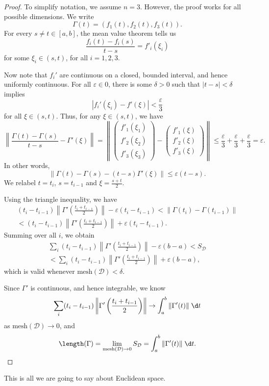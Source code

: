 \documentclass[a4paper]{article}
\begin{document}
\begin{proof}
  To simplify notation, we assume $n = 3$. However, the proof works for all possible dimensions. We write
  \[
    \Gamma(t) = (f_1(t), f_2(t), f_3(t)).
  \]
  For every $s \not= t \in [a, b]$, the mean value theorem tells us
  \[
    \frac{f_i(t) - f_i(s)}{t - s} = f'_i (\xi_i)
  \]
  for some $\xi_i \in (s, t)$, for all $i = 1, 2, 3$.

  Now note that $f_i'$ are continuous on a closed, bounded interval, and hence uniformly continuous. For all $\varepsilon \in 0$, there is some $\delta > 0$ such that $|t - s| < \delta$ implies
  \[
    |f_i'(\xi_i) - f'(\xi)| < \frac{\varepsilon}{3}
  \]
  for all $\xi \in (s, t)$. Thus, for any $\xi \in (s, t)$, we have
  \[
    \left\|\frac{\Gamma(t) - \Gamma(s)}{t - s} - \Gamma'(\xi)\right\| = \left\|\begin{pmatrix}f'_1(\xi_1)\\ f'_2(\xi_2)\\ f'_3(\xi_3)\end{pmatrix} - \begin{pmatrix}f'_1(\xi)\\ f'_2(\xi)\\ f'_3(\xi)\end{pmatrix}\right\| \leq \frac{\varepsilon}{3} + \frac{\varepsilon}{3} + \frac{\varepsilon}{3} = \varepsilon.
  \]
  In other words,
  \[
    \|\Gamma(t) - \Gamma(s) - (t - s) \Gamma'(\xi)\| \leq \varepsilon(t - s).
  \]
  We relabel $t = t_i$, $s = t_{i - 1}$ and $\xi = \frac{s + t}{2}$.

  Using the triangle inequality, we have
  \begin{multline*}
    (t_i - t_{i - 1}) \left\|\Gamma'\left(\frac{t_i + t_{i - 1}}{2}\right)\right\| - \varepsilon(t_i - t_{i - 1}) < \|\Gamma(t_i) - \Gamma(t_{i - 1})\| \\
    < (t_i - t_{i - 1}) \left\|\Gamma'\left(\frac{t_i + t_{i - 1}}{2}\right)\right\| + \varepsilon(t_i - t_{i - 1}).
  \end{multline*}
  Summing over all $i$, we obtain
  \begin{multline*}
    \sum_i (t_i - t_{i - 1}) \left\|\Gamma'\left(\frac{t_i + t_{i - 1}}{2}\right)\right\| - \varepsilon(b - a) < S_{\mathcal{D}}\\
    < \sum_i (t_i - t_{i - 1}) \left\|\Gamma'\left(\frac{t_i + t_{i - 1}}{2}\right)\right\| + \varepsilon(b - a),
  \end{multline*}
  which is valid whenever $\mathrm{mesh}(\mathcal{D}) < \delta$.

  Since $\Gamma'$ is continuous, and hence integrable, we know
  \[
    \sum_i (t_i - t_{i - 1}) \left\|\Gamma'\left(\frac{t_i + t_{i - 1}}{2}\right)\right\| \to \int_a^b \|\Gamma'(t)\|\;\d t
  \]
  as $\mathrm{mesh}(\mathcal{D}) \to 0$, and
  \[
    \length(\Gamma) = \lim_{\mathrm{mesh}(\mathcal{D}) \to 0} S_\mathcal{D} = \int_a^b \|\Gamma'(t)\|\;\d t.\qedhere
  \]
\end{proof}
This is all we are going to say about Euclidean space.
\end{document}
